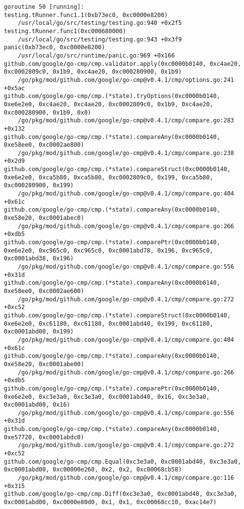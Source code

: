 \documentclass[a4paper]{paper}
\begin{document}
\begin{verbatim}
goroutine 50 [running]:
testing.tRunner.func1.1(0xb73ec0, 0xc0000e8200)
	/usr/local/go/src/testing/testing.go:940 +0x2f5
testing.tRunner.func1(0xc000680000)
	/usr/local/go/src/testing/testing.go:943 +0x3f9
panic(0xb73ec0, 0xc0000e8200)
	/usr/local/go/src/runtime/panic.go:969 +0x166
github.com/google/go-cmp/cmp.validator.apply(0xc0000b0140, 0xc4ae20, 0xc0002809c0, 0x1b9, 0xc4ae20, 0xc000280900, 0x1b9)
	/go/pkg/mod/github.com/google/go-cmp@v0.4.1/cmp/options.go:241 +0x5ac
github.com/google/go-cmp/cmp.(*state).tryOptions(0xc0000b0140, 0xe6e2e0, 0xc4ae20, 0xc4ae20, 0xc0002809c0, 0x1b9, 0xc4ae20, 0xc000280900, 0x1b9, 0x0)
	/go/pkg/mod/github.com/google/go-cmp@v0.4.1/cmp/compare.go:283 +0x132
github.com/google/go-cmp/cmp.(*state).compareAny(0xc0000b0140, 0xe58ee0, 0xc0002ae800)
	/go/pkg/mod/github.com/google/go-cmp@v0.4.1/cmp/compare.go:238 +0x2d9
github.com/google/go-cmp/cmp.(*state).compareStruct(0xc0000b0140, 0xe6e2e0, 0xca5b80, 0xca5b80, 0xc0002809c0, 0x199, 0xca5b80, 0xc000280900, 0x199)
	/go/pkg/mod/github.com/google/go-cmp@v0.4.1/cmp/compare.go:404 +0x61c
github.com/google/go-cmp/cmp.(*state).compareAny(0xc0000b0140, 0xe58e20, 0xc0001abec0)
	/go/pkg/mod/github.com/google/go-cmp@v0.4.1/cmp/compare.go:266 +0xdb5
github.com/google/go-cmp/cmp.(*state).comparePtr(0xc0000b0140, 0xe6e2e0, 0xc965c0, 0xc965c0, 0xc0001abd78, 0x196, 0xc965c0, 0xc0001abd38, 0x196)
	/go/pkg/mod/github.com/google/go-cmp@v0.4.1/cmp/compare.go:556 +0x31d
github.com/google/go-cmp/cmp.(*state).compareAny(0xc0000b0140, 0xe58ee0, 0xc0002ae600)
	/go/pkg/mod/github.com/google/go-cmp@v0.4.1/cmp/compare.go:272 +0xc52
github.com/google/go-cmp/cmp.(*state).compareStruct(0xc0000b0140, 0xe6e2e0, 0xc61180, 0xc61180, 0xc0001abd40, 0x199, 0xc61180, 0xc0001abd00, 0x199)
	/go/pkg/mod/github.com/google/go-cmp@v0.4.1/cmp/compare.go:404 +0x61c
github.com/google/go-cmp/cmp.(*state).compareAny(0xc0000b0140, 0xe58e20, 0xc0001abe00)
	/go/pkg/mod/github.com/google/go-cmp@v0.4.1/cmp/compare.go:266 +0xdb5
github.com/google/go-cmp/cmp.(*state).comparePtr(0xc0000b0140, 0xe6e2e0, 0xc3e3a0, 0xc3e3a0, 0xc0001abd40, 0x16, 0xc3e3a0, 0xc0001abd00, 0x16)
	/go/pkg/mod/github.com/google/go-cmp@v0.4.1/cmp/compare.go:556 +0x31d
github.com/google/go-cmp/cmp.(*state).compareAny(0xc0000b0140, 0xe57720, 0xc0001abdc0)
	/go/pkg/mod/github.com/google/go-cmp@v0.4.1/cmp/compare.go:272 +0xc52
github.com/google/go-cmp/cmp.Equal(0xc3e3a0, 0xc0001abd40, 0xc3e3a0, 0xc0001abd00, 0xc00000e260, 0x2, 0x2, 0xc00068cb58)
	/go/pkg/mod/github.com/google/go-cmp@v0.4.1/cmp/compare.go:116 +0x315
github.com/google/go-cmp/cmp.Diff(0xc3e3a0, 0xc0001abd40, 0xc3e3a0, 0xc0001abd00, 0xc0000e80d0, 0x1, 0x1, 0xc00068cc10, 0xac14e7)

\end{verbatim}
\end{document}
